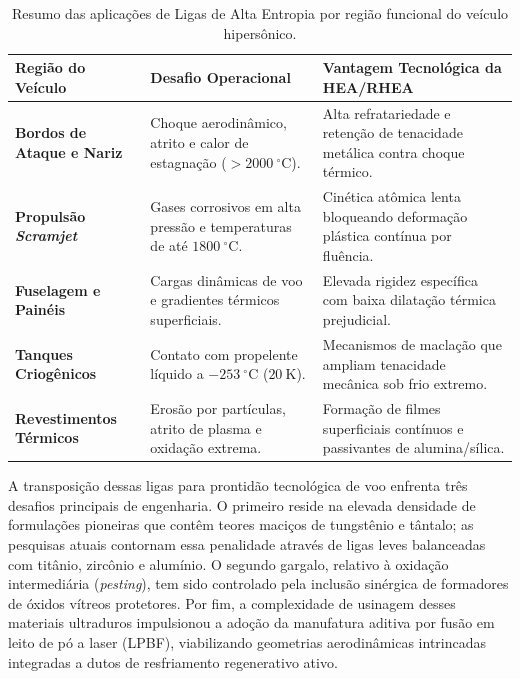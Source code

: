 \begin{table}[!htbp]
\centering
\caption{Resumo das aplicações de Ligas de Alta Entropia por região funcional do veículo hipersônico.}\label{tab:comparativo_zonal_hea}
\small
\begin{tabularx}{\textwidth}{>{\raggedright\arraybackslash}p{3.2cm} >{\raggedright\arraybackslash}X >{\raggedright\arraybackslash}X}
\toprule
\textbf{Região do Veículo} & \textbf{Desafio Operacional} & \textbf{Vantagem Tecnológica da HEA/RHEA} \\
\midrule
\textbf{Bordos de Ataque e Nariz} & Choque aerodinâmico, atrito e calor de estagnação ($> 2000~^\circ\mathrm{C}$). & Alta refratariedade e retenção de tenacidade metálica contra choque térmico. \\
\textbf{Propulsão \emph{Scramjet}} & Gases corrosivos em alta pressão e temperaturas de até $1800~^\circ\mathrm{C}$. & Cinética atômica lenta bloqueando deformação plástica contínua por fluência. \\
\textbf{Fuselagem e Painéis} & Cargas dinâmicas de voo e gradientes térmicos superficiais. & Elevada rigidez específica com baixa dilatação térmica prejudicial. \\
\textbf{Tanques Criogênicos} & Contato com propelente líquido a $-253~^\circ\mathrm{C}$ ($20~\mathrm{K}$). & Mecanismos de maclação que ampliam tenacidade mecânica sob frio extremo. \\
\textbf{Revestimentos Térmicos} & Erosão por partículas, atrito de plasma e oxidação extrema. & Formação de filmes superficiais contínuos e passivantes de alumina/sílica. \\
\bottomrule
\end{tabularx}
\end{table}

A transposição dessas ligas para prontidão tecnológica de voo enfrenta três desafios principais de engenharia. O primeiro reside na elevada densidade de formulações pioneiras que contêm teores maciços de tungstênio e tântalo; as pesquisas atuais contornam essa penalidade através de ligas leves balanceadas com titânio, zircônio e alumínio. O segundo gargalo, relativo à oxidação intermediária (\emph{pesting}), tem sido controlado pela inclusão sinérgica de formadores de óxidos vítreos protetores. Por fim, a complexidade de usinagem desses materiais ultraduros impulsionou a adoção da manufatura aditiva por fusão em leito de pó a laser (LPBF), viabilizando geometrias aerodinâmicas intrincadas integradas a dutos de resfriamento regenerativo ativo.
